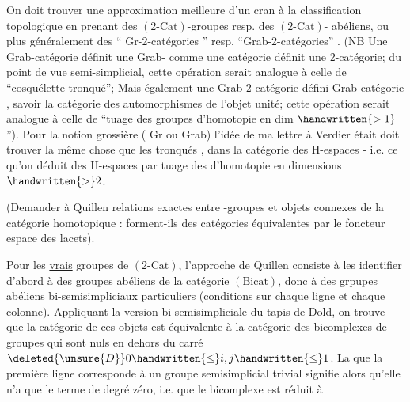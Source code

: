 
On doit trouver une approximation meilleure d'un cran à la classification topologique en prenant des $(2\text{-}\mathrm{Cat})$-groupes resp. des $(2\text{-}\mathrm{Cat})$- abéliens, ou plus généralement des `` Gr-2-catégories '' resp. ``Grab-2-catégories'' . (NB Une Grab-catégorie définit une Grab- comme une catégorie définit une 2-catégorie; du point de vue semi-simplicial, cette opération serait analogue à celle de ``cosquélette tronqué''; Mais également une Grab-2-catégorie défini  Grab-catégorie , savoir la catégorie des automorphismes de l'objet unité; cette  opération serait analogue à celle de ``tuage des groupes d'homotopie en dim $\handwritten{>1}$''). Pour la notion grossière ( Gr ou Grab) l'idée de ma lettre à Verdier était  doit trouver la même chose que les tronqués , dans la catégorie \uline{} des H-espaces - i.e. ce qu'on déduit des H-espaces par tuage des  d'homotopie en dimensions $\handwritten{>}2$.

\margin{\handwritten{\(\Vert\)}}%
(Demander à Quillen relations exactes entre -groupes et objets  connexes de la catégorie homotopique : forment-ils des catégories équivalentes par le foncteur espace des lacets).

Pour les \uline{vrais} groupes  de $(2\text{-}\mathrm{Cat})$, l'approche de Quillen consiste à les identifier d'abord à des groupes abéliens de la catégorie $(\mathrm{Bicat})$, donc à des grpupes abéliens bi-semisimpliciaux particuliers (conditions sur chaque ligne et chaque colonne). Appliquant la version bi-semisimpliciale du tapis de Dold, on trouve que  la catégorie de ces objets est équivalente à la catégorie des  bicomplexes  de groupes  qui sont nuls en dehors du carré $\deleted{\unsure{D}}0\handwritten{\leq}i,j\handwritten{\leq}1$.  La  que la première ligne corresponde à un  groupe semisimplicial trivial signifie alors qu'elle n'a que le terme de degré zéro, i.e. que le bicomplexe est réduit à


